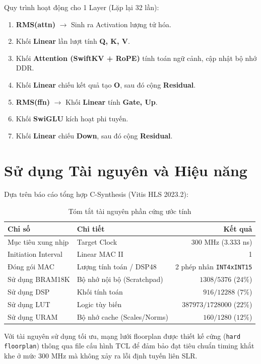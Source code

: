 \documentclass[12pt,a4paper]{article}
\begin{document}
Quy trình hoạt động cho 1 Layer (Lặp lại 32 lần):
\begin{enumerate}
    \item \textbf{RMS(attn)} $\rightarrow$ Sinh ra Activation lượng tử hóa.
    \item Khối \textbf{Linear} lần lượt tính \textbf{Q, K, V}.
    \item Khối \textbf{Attention (SwiftKV + RoPE)} tính toán ngữ cảnh, cập nhật bộ nhớ DDR.
    \item Khối \textbf{Linear} chiếu kết quả tạo \textbf{O}, sau đó cộng \textbf{Residual}.
    \item \textbf{RMS(ffn)} $\rightarrow$ Khối \textbf{Linear} tính \textbf{Gate, Up}.
    \item Khối \textbf{SwiGLU} kích hoạt phi tuyến.
    \item Khối \textbf{Linear} chiếu \textbf{Down}, sau đó cộng \textbf{Residual}.
\end{enumerate}

\section{Sử dụng Tài nguyên và Hiệu năng}
Dựa trên báo cáo tổng hợp C-Synthesis (Vitis HLS 2023.2):
\begin{table}[H]
    \centering
    \begin{tabular}{l l r}
    \toprule
    \textbf{Chỉ số} & \textbf{Chi tiết} & \textbf{Kết quả} \\
    \midrule
    Mục tiêu xung nhịp & Target Clock & $300$ MHz ($3.333$ ns) \\
    Initiation Interval & Linear MAC II & 1 \\
    Đóng gói MAC & Lượng tính toán / DSP48 & 2 phép nhân \texttt{INT4xINT15} \\
    Sử dụng BRAM18K & Bộ nhớ nội bộ (Scratchpad) & $1308 / 5376$ ($24\%$) \\
    Sử dụng DSP & Khối tính toán & $916 / 12288$ ($7\%$) \\
    Sử dụng LUT & Logic tùy biến & $387973 / 1728000$ ($22\%$) \\
    Sử dụng URAM & Bộ nhớ cache (Scales/Norms) & $160 / 1280$ ($12\%$) \\
    \bottomrule
    \end{tabular}
    \caption{Tóm tắt tài nguyên phần cứng ước tính}
\end{table}
Với tài nguyên sử dụng tối ưu, mạng lưới floorplan được thiết kế cứng (\texttt{hard floorplan}) thông qua file cấu hình TCL để đảm bảo đạt tiêu chuẩn timing khắt khe ở mức $300$ MHz mà không xảy ra lỗi định tuyến liên SLR.
\end{document}
